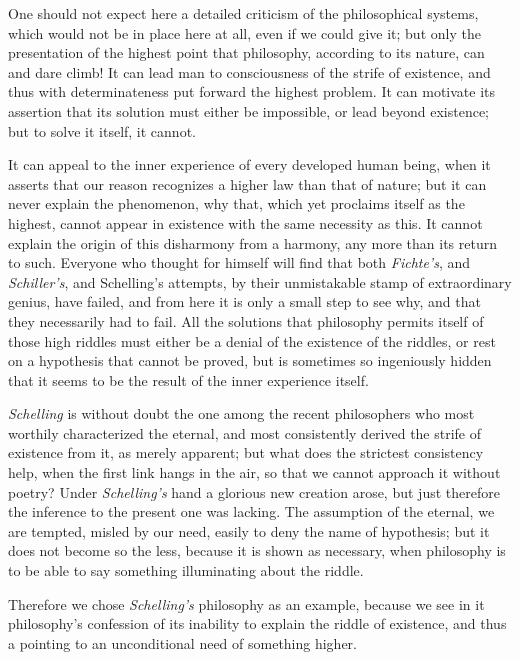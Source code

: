 \documentclass[12pt,a4paper,openany]{book}
\newcommand{\opage}[1]{\marginnote{\footnotesize\textit{[#1]}}}
\begin{document}
One should not expect here a detailed criticism of the philosophical systems, which
would not be in place here at all, even if we could give it; but only the
presentation of the highest point that philosophy, according to its nature, can and
dare climb!
\setcounter{footnote}{0}%
\opage{57}It can lead man to consciousness of the strife of existence, and thus with
determinateness put forward the highest problem. It can motivate its assertion that
its solution must either be impossible, or lead beyond existence; but to solve it
itself, it cannot.

It can appeal to the inner experience of every developed human being, when it
asserts that our reason recognizes a higher law than that of nature; but it can
never explain the phenomenon, why that, which yet proclaims itself as the highest,
cannot appear in existence with the same necessity as this. It cannot explain the
origin of this disharmony from a harmony, any more than its return to such. Everyone
who thought for himself will find that both \emph{Fichte's}, and \emph{Schiller's},
and Schelling's attempts, by their unmistakable stamp of extraordinary genius, have
failed, and from here it is only a small step to see why, and that they necessarily
had to fail. All the solutions that philosophy permits itself of those high riddles
must either be a denial of the existence of the riddles, or rest on a hypothesis
that cannot be proved, but is sometimes so ingeniously hidden that it seems to be
the result of the inner experience itself.

\emph{Schelling} is without doubt the one among the recent philosophers who most
worthily characterized the eternal, and most consistently derived the strife of
existence from it, as merely apparent; but what does the strictest consistency help,
when the first link hangs in the air, so that we cannot approach it without poetry?
Under \emph{Schelling's} hand a glorious new creation arose, but just therefore the
inference to the present one was lacking. The assumption of the eternal, we are
tempted, misled by our need, easily to deny the name of hypothesis; but it does not
become so the less, because it is shown as necessary, when philosophy is to be able
to say something illuminating about the riddle.

Therefore we chose \emph{Schelling's} philosophy as an example, because we see in it
philosophy's confession of its
\setcounter{footnote}{0}%
\opage{58}inability to explain the riddle of existence, and thus a pointing to an
unconditional need of something higher.
\end{document}
